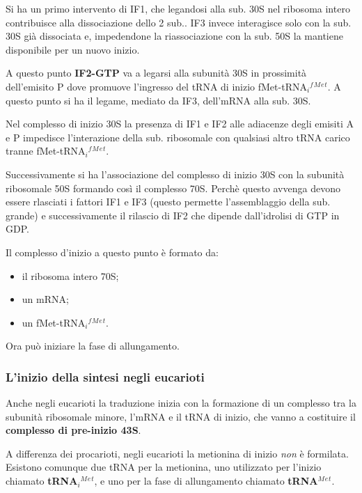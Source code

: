 \documentclass[]{article}
\begin{document}
Si ha un primo intervento di IF1, che legandosi alla sub. 30S nel
ribosoma intero contribuisce alla dissociazione dello 2 sub.. IF3 invece
interagisce solo con la sub. 30S già dissociata e, impedendone la
riassociazione con la sub. 50S la mantiene disponibile per un nuovo
inizio.

A questo punto \textbf{IF2-GTP} va a legarsi alla subunità 30S in
prossimità dell'emisito P dove promuove l'ingresso del tRNA di inizio
fMet-tRNA\(_i\)\(^f\)\(^M\)\(^e\)\(^t\). A questo punto si ha il legame,
mediato da IF3, dell'mRNA alla sub. 30S.

Nel complesso di inizio 30S la presenza di IF1 e IF2 alle adiacenze
degli emisiti A e P impedisce l'interazione della sub. ribosomale con
qualsiasi altro tRNA carico tranne
fMet-tRNA\(_i\)\(^f\)\(^M\)\(^e\)\(^t\).

Successivamente si ha l'associazione del complesso di inizio 30S con la
subunità ribosomale 50S formando così il complesso 70S. Perchè questo
avvenga devono essere rlasciati i fattori IF1 e IF3 (questo permette
l'assemblaggio della sub. grande) e successivamente il rilascio di IF2
che dipende dall'idrolisi di GTP in GDP.

Il complesso d'inizio a questo punto è formato da:

\begin{itemize}
\itemsep1pt\parskip0pt
\item
  il ribosoma intero 70S;
\item
  un mRNA;
\item
  un fMet-tRNA\(_i\)\(^f\)\(^M\)\(^e\)\(^t\).
\end{itemize}

Ora può iniziare la fase di allungamento.

\subsubsection{L'inizio della sintesi negli
eucarioti}\label{linizio-della-sintesi-negli-eucarioti}

Anche negli eucarioti la traduzione inizia con la formazione di un
complesso tra la subunità ribosomale minore, l'mRNA e il tRNA di inizio,
che vanno a costituire il \textbf{complesso di pre-inizio 43S}.

A differenza dei procarioti, negli eucarioti la metionina di inizio
\emph{non} è formilata. Esistono comunque due tRNA per la metionina, uno
utilizzato per l'inizio chiamato \textbf{tRNA\(_i\)\(^M\)\(^e\)\(^t\)},
e uno per la fase di allungamento chiamato
\textbf{tRNA\(^M\)\(^e\)\(^t\)}.
\end{document}
